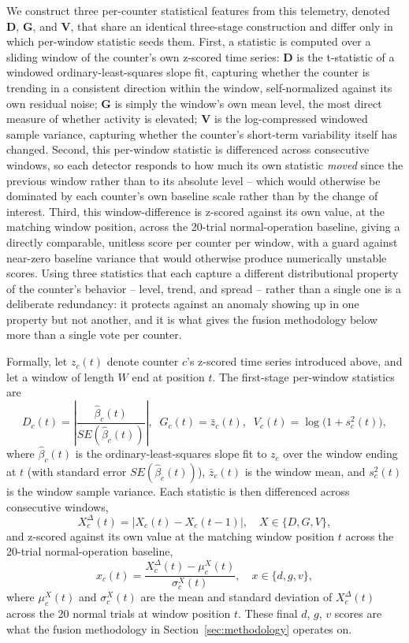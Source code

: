 \documentclass[conference]{IEEEtran}
\begin{document}
We construct three per-counter statistical features from this telemetry, denoted \textbf{D}, \textbf{G}, and \textbf{V}, that share an identical three-stage construction and differ only in which per-window statistic seeds them. First, a statistic is computed over a sliding window of the counter's own z-scored time series: \textbf{D} is the t-statistic of a windowed ordinary-least-squares slope fit, capturing whether the counter is trending in a consistent direction within the window, self-normalized against its own residual noise; \textbf{G} is simply the window's own mean level, the most direct measure of whether activity is elevated; \textbf{V} is the log-compressed windowed sample variance, capturing whether the counter's short-term variability itself has changed. Second, this per-window statistic is differenced across consecutive windows, so each detector responds to how much its own statistic \emph{moved} since the previous window rather than to its absolute level -- which would otherwise be dominated by each counter's own baseline scale rather than by the change of interest. Third, this window-difference is z-scored against its own value, at the matching window position, across the 20-trial normal-operation baseline, giving a directly comparable, unitless score per counter per window, with a guard against near-zero baseline variance that would otherwise produce numerically unstable scores. Using three statistics that each capture a different distributional property of the counter's behavior -- level, trend, and spread -- rather than a single one is a deliberate redundancy: it protects against an anomaly showing up in one property but not another, and it is what gives the fusion methodology below more than a single vote per counter.

Formally, let $z_c(t)$ denote counter $c$'s z-scored time series introduced above, and let a window of length $W$ end at position $t$. The first-stage per-window statistics are
\begin{equation}
D_c(t) = \left|\frac{\hat{\beta}_c(t)}{SE(\hat{\beta}_c(t))}\right|, \;\; G_c(t) = \bar{z}_c(t), \;\; V_c(t) = \log\!\big(1 + s_c^2(t)\big),
\end{equation}
where $\hat{\beta}_c(t)$ is the ordinary-least-squares slope fit to $z_c$ over the window ending at $t$ (with standard error $SE(\hat{\beta}_c(t))$), $\bar{z}_c(t)$ is the window mean, and $s_c^2(t)$ is the window sample variance. Each statistic is then differenced across consecutive windows,
\begin{equation}
X_c^{\Delta}(t) = \big|X_c(t) - X_c(t-1)\big|, \quad X \in \{D, G, V\},
\end{equation}
and z-scored against its own value at the matching window position $t$ across the 20-trial normal-operation baseline,
\begin{equation}
x_c(t) = \frac{X_c^{\Delta}(t) - \mu_c^X(t)}{\sigma_c^X(t)}, \quad x \in \{d, g, v\},
\end{equation}
where $\mu_c^X(t)$ and $\sigma_c^X(t)$ are the mean and standard deviation of $X_c^\Delta(t)$ across the 20 normal trials at window position $t$. These final $d$, $g$, $v$ scores are what the fusion methodology in Section~\ref{sec:methodology} operates on.
\end{document}

